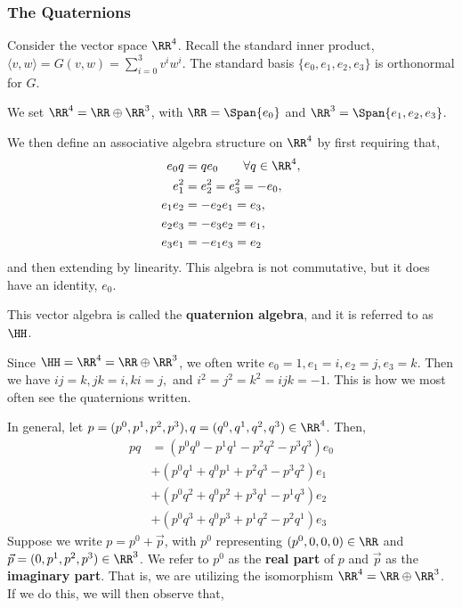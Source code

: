 \subsubsection{The Quaternions}
\begin{defn}[Quaternions]
    Consider the vector space $\RR^4$. Recall the standard inner product, $\langle v,w\rangle = G(v,w) = \sum_{i=0}^3 v^iw^i$. The standard basis $\{e_0,e_1,e_2,e_3\}$ is orthonormal for $G$.

    We set $\RR^4 = \RR \oplus \RR^3$, with $\RR = \Span\{e_0\}$ and $\RR^3 = \Span\{e_1,e_2,e_3\}$.

    We then define an associative algebra structure on $\RR^4$ by first requiring that,
    \begin{align}
        e_0 q &= q e_0 \qquad \forall q\in \RR^4,\\
        e_1^2 &=e_2^2=e_3^2=-e_0,\\
        e_1e_2&=-e_2e_1=e_3,\\
        e_2e_3&=-e_3e_2=e_1,\\
        e_3e_1&=-e_1e_3=e_2
    \end{align}
    and then extending by linearity.
    This algebra is not commutative, but it does have an identity, $e_0$.

    This vector algebra is called the \textbf{quaternion algebra}, and it is referred to as $\HH$.
\end{defn}
\begin{remark*}
    Since $\HH =\RR^4 =  \RR\oplus \RR^3$, we often write $e_0 = 1, e_1 = i, e_2 = j, e_3 = k$. Then we have $ij=k, jk = i, ki = j,$ and $i^2=j^2=k^2=ijk=-1$. This is how we most often see the quaternions written.
\end{remark*}
In general, let $p = (p^0,p^1,p^2,p^3),q=(q^0,q^1,q^2,q^3)\in\RR^4$. Then,
\begin{align*}
    pq &= (p^0q^0-p^1q^1-p^2q^2-p^3q^3)e_0\\
    &+(p^0q^1+q^0p^1+p^2q^3-p^3q^2)e_1\\
    &+(p^0q^2+q^0p^2+p^3q^1-p^1q^3)e_2\\
    &+(p^0q^3+q^0p^3+p^1q^2-p^2q^1)e_3
\end{align*}
Suppose we write $p = p^0 + \vec{p}$, with $p^0$ representing $(p^0,0,0,0)\in\RR$ and $\vec{p} = (0,p^1,p^2,p^3)\in \RR^3$. We refer to $p^0$ as the \textbf{real part} of $p$ and $\vec{p}$ as the \textbf{imaginary part}. That is, we are utilizing the isomorphism $\RR^4 = \RR\oplus \RR^3$. If we do this, we will then observe that,
